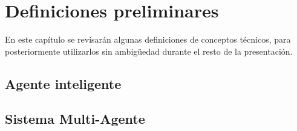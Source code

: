 
\chapter{Definiciones preliminares} 
\label{chap:definiciones_preliminares}


 En este capítulo se revisarán algunas definiciones de conceptos
 técnicos, para posteriormente utilizarlos sin ambigüedad durante el
 resto de la presentación.

\section{Agente inteligente}
\label{sec:agente_inteligente}
 
 
 

\section{Sistema Multi-Agente}
\label{sec:sistema_multiagente}
 
 
